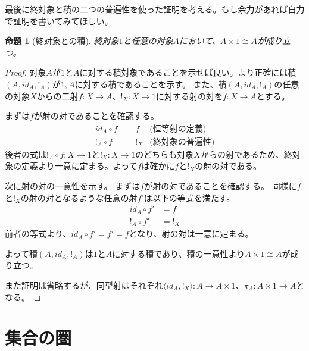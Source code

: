 \documentclass[uplatex,dvipdfmx]{jsarticle}
\newcommand{\arrow}{\rightarrow}
\newcommand{\tuple}[1]{\langle #1\rangle}
\newcommand{\mor}[3]{#1:#2\arrow #3}
\newtheorem{proof}{証明}[section]
\newtheorem{prop}[proof]{命題}
\numberwithin{proof}{subsection}
\begin{document}
  最後に終対象と積の二つの普遍性を使った証明を考える。もし余力があれば自力で証明を書いてみてほしい。
  \begin{prop}[終対象との積]
    終対象$1$と任意の対象$A$において、$A\times 1\cong A$が成り立つ。
  \end{prop}
  \begin{proof}
    対象$A$が$1$と$A$に対する積対象であることを示せば良い。より正確には積$(A,id_A,!_A)$が$1,A$に対する積であることを示す。
    また、積$(A,id_A,!_A)$の任意の対象$X$からの二射$\mor{f}{X}{A}$、$\mor{!_X}{X}{1}$に対する射の対を$\mor{f}{X}{A}$とする。
    
    \begin{center}
    \end{center}

    まずは$f$が射の対であることを確認する。
    \begin{align*}
      id_A\circ f &= f&\text{(恒等射の定義)}\\
      !_A\circ f &= !_X&\text{(終対象の普遍性)}
    \end{align*}
    後者の式は$\mor{!_A\circ f}{X}{1}$と$\mor{!_X}{X}{1}$のどちらも対象$X$からの射であるため、終対象の定義より一意に定まる。よって$f$は確かに$f$と$!_X$の射の対である。

    次に射の対の一意性を示す。
    まずは$f$が射の対であることを確認する。
    同様に$f$と$!_X$の射の対となるような任意の射$f'$は以下の等式を満たす。
    \begin{align*}
      id_A\circ f' &= f\\
      !_A\circ f' &= !_X
    \end{align*}
    前者の等式より、$id_A\circ f'=f'=f$となり、射の対は一意に定まる。

    よって積$(A,id_A,!_A)$は$1$と$A$に対する積であり、積の一意性より$A\times 1\cong A$が成り立つ。

    また証明は省略するが、同型射はそれぞれ$\mor{\tuple{id_A,!_X}}{A}{A\times 1}$、$\mor{\pi_A}{A\times 1}{A}$となる。
  \end{proof}
  \section{集合の圏}
\end{document}

